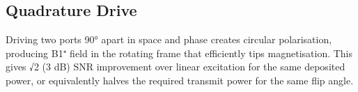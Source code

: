 				

\subsection{Quadrature Drive}

				

Driving two ports 90° apart in space and phase creates circular polarisation, producing B1⁺ field in the rotating frame that efficiently tips magnetisation. This gives √2 (3 dB) SNR improvement over linear excitation for the same deposited power, or equivalently halves the required transmit power for the same flip angle.



